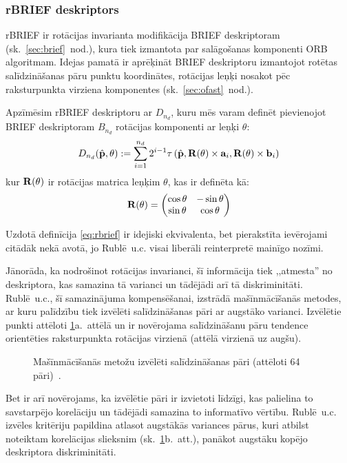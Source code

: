 \subsubsection{rBRIEF deskriptors} \label{sec:rbrief-def}
rBRIEF ir rotācijas invarianta modifikācija
BRIEF deskriptoram (sk.~\ref{sec:brief}~nod.),
kura tiek izmantota par salāgošanas komponenti ORB
algoritmam. Idejas pamatā ir aprēķināt BRIEF deskriptoru izmantojot
rotētas salīdzināšanas pāru punktu koordinātes, rotācijas leņķi nosakot pēc
raksturpunkta virziena komponentes (sk.~\ref{sec:ofast}~nod.).

Apzīmēsim rBRIEF deskriptoru ar $D_{n_d}$, kuru mēs varam definēt
pievienojot BRIEF deskriptoram $B_{n_d}$ rotācijas komponenti ar leņķi $\theta$:
\begin{equation}\label{eq:rbrief}
	D_{n_d}(\hat{\mathbf{p}}, \theta) := \sum_{i=1}^{n_d} 2^{i-1}
		\tau\left(\hat{\mathbf{p}},
		          \mathbf{R}(\theta) \times \mathbf{a}_i,
		          \mathbf{R}(\theta) \times \mathbf{b}_i\right)
\end{equation}
kur $\mathbf{R}(\theta)$ ir rotācijas matrica leņķim $\theta$, kas ir definēta kā:
\[
	\mathbf{R}(\theta) = 
		\begin{pmatrix}
			\cos\theta & -\sin\theta\\
			\sin\theta & \cos\theta
		\end{pmatrix}
\]

Uzdotā definīcija \eqref{eq:rbrief} ir idejiski ekvivalenta, bet 
pierakstīta ievērojami citādāk nekā \cite{ORB} avotā, jo 
Rublē~u.c. visai liberāli reinterpretē mainīgo nozīmi.

Jānorāda, ka nodrošinot rotācijas invarianci, šī informācija tiek
,,atmesta'' no deskriptora, kas samazina tā varianci un tādējādi arī
tā diskriminitāti. Rublē~u.c.\cite{ORB}, šī samazinājuma kompensēšanai,
izstrādā mašīnmācīšanās metodes, ar kuru palīdzību tiek izvēlēti
salīdzināšanas pāri ar augstāko varianci. Izvēlētie punkti attēloti
\ref{fig:pattern2}a.~attēlā un ir novērojama salīdzināšanu pāru tendence
orientēties raksturpunkta rotācijas virzienā (attēlā virzienā uz augšu).
\begin{figure}[tbh]
	\centering
	\def\svgwidth{0.7\linewidth}
	{}
	\caption{Mašīnmācīšanās metožu izvēlēti salīdzināšanas pāri
		(attēloti 64 pāri)~\cite{ORB}.}
	\label{fig:pattern2}
\end{figure}
Bet ir arī novērojams, ka izvēlētie pāri ir izvietoti līdzīgi, kas palielina
to savstarpējo korelāciju
un tādējādi samazina to informatīvo vērtību. Rublē~u.c.\cite{ORB} izvēles
kritēriju papildina atlasot augstākās variances pārus, kuri atbilst
noteiktam korelācijas slieksnim (sk.~\ref{fig:pattern2}b.~att.), panākot
augstāku kopējo deskriptora diskriminitāti.
